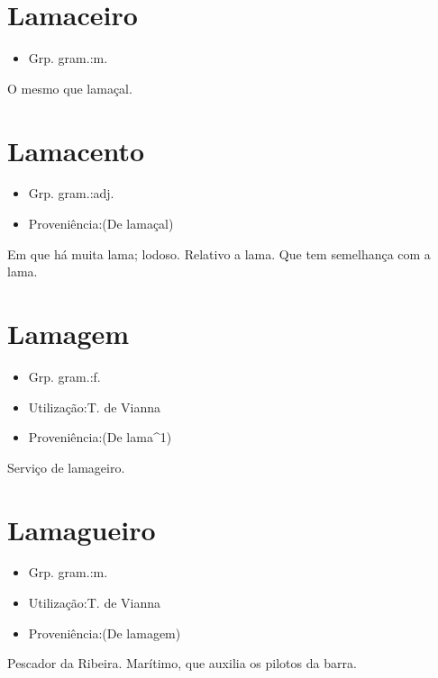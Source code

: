 \section{Lamaceiro}
\begin{itemize}
\item {Grp. gram.:m.}
\end{itemize}
O mesmo que \textunderscore lamaçal\textunderscore .
\section{Lamacento}
\begin{itemize}
\item {Grp. gram.:adj.}
\end{itemize}
\begin{itemize}
\item {Proveniência:(De \textunderscore lamaçal\textunderscore )}
\end{itemize}
Em que há muita lama; lodoso.
Relativo a lama.
Que tem semelhança com a lama.
\section{Lamagem}
\begin{itemize}
\item {Grp. gram.:f.}
\end{itemize}
\begin{itemize}
\item {Utilização:T. de Vianna}
\end{itemize}
\begin{itemize}
\item {Proveniência:(De \textunderscore lama\textunderscore ^1)}
\end{itemize}
Serviço de lamageiro.
\section{Lamagueiro}
\begin{itemize}
\item {Grp. gram.:m.}
\end{itemize}
\begin{itemize}
\item {Utilização:T. de Vianna}
\end{itemize}
\begin{itemize}
\item {Proveniência:(De \textunderscore lamagem\textunderscore )}
\end{itemize}
Pescador da Ribeira.
Marítimo, que auxilia os pilotos da barra.

